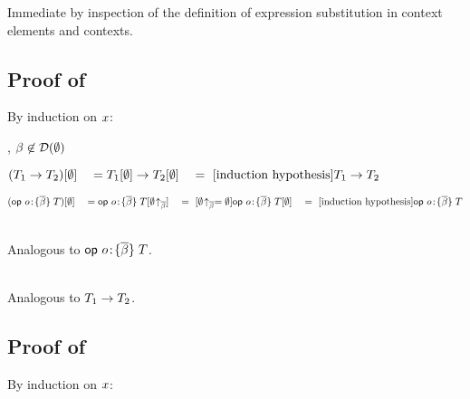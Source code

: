 Immediate by inspection of the definition of expression substitution in
context elements and contexts.



\subsection*{Proof of }

By induction on $x$:

\begin{bycase}

\Case{$\tvar$}
\StepO{\tsbs{\tvar}{\emptyset}=\tvar}
      {, $\beta\not\in\mathcal{D}(\emptyset)$}

\Case{$\bool$, $\var$, $\tdecO$, $\tvdecO$, $\mtcx$}

\Case{$\tarrO$}
\begin{links}
$(T_1\to T_2)[\emptyset]
 \\\hspace*{1em}=\\
 T_1[\emptyset]\to T_2[\emptyset]
 \\\hspace*{1em}=\ [\mbox{induction hypothesis}]\\
 T_1\to T_2$
\end{links}

\Case{$\odecO$}
\begin{links}
$\tsbs{(\odecO)}{\emptyset}
 \linK{=}
 \odec{\onam}{\tvarS}{\tsbs{\typ}{\funrestrc{\emptyset}{\tvarS}}}
 \link{=}{$\funrestrc{\emptyset}{\tvarS}=\emptyset$}
 \odec{\onam}{\tvarS}{\tsbs{\typ}{\emptyset}}
 \link{=}{\indhyp}
 \odecO$
\end{links}

\Case{$\axO$, $\lemO$}\\
Analogous to $\odecO$.

\Case{\restkinds}\\
Analogous to $\tarrO$.

\end{bycase}



\subsection*{Proof of }

By induction on $x$:

